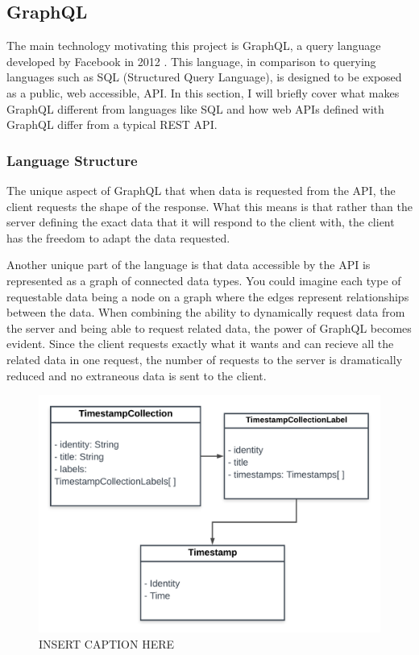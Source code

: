 \subsection{GraphQL}
The main technology motivating this project is GraphQL, a query language developed by Facebook in 2012 \cite{byronKeynoteBriefHistory2019}.  This language, in comparison to querying languages such as SQL (Structured Query Language), is designed to be exposed as a public, web accessible, API.   In this section, I will briefly cover what makes GraphQL different from languages like SQL and how web APIs defined with GraphQL differ from a typical REST API.

\subsubsection{Language Structure}

The unique aspect of GraphQL that when data is requested from the API, the client requests the shape of the response.  What this means is that rather than the server defining the exact data that it will respond to the client with, the client has the freedom to adapt the data requested.

Another unique part of the language is that data accessible by the API is represented as a graph of connected data types.  You could imagine each type of requestable data being a node on a graph where the edges represent relationships between the data.  When combining the ability to dynamically request data from the server and being able to request related data, the power of GraphQL becomes evident.  Since the client requests exactly what it wants and can recieve all the related data in one request, the number of requests to the server is dramatically reduced and no extraneous data is sent to the client.

\begin{figure}[htbp]
    \centering
    \includegraphics[scale=.15]{img/schema-graph.png}
    \caption{INSERT CAPTION HERE}
    \label{fig:schema-graph}
\end{figure}

